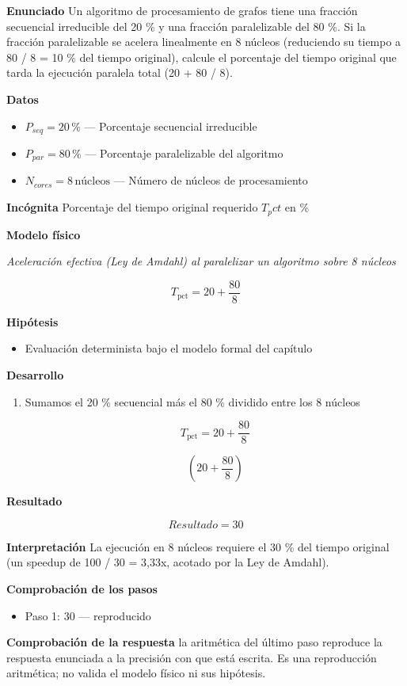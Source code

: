 \documentclass{book}
\begin{document}
\begin{tcolorbox}[title={Problema resuelto}, studiumworked, breakable]

\noindent\textbf{Enunciado}
Un algoritmo de procesamiento de grafos tiene una fracción secuencial irreducible del 20 \% y una fracción paralelizable del 80 \%. Si la fracción paralelizable se acelera linealmente en 8 núcleos (reduciendo su tiempo a 80 / 8 = 10 \% del tiempo original), calcule el porcentaje del tiempo original que tarda la ejecución paralela total (20 + 80 / 8).

\noindent\textbf{Datos}
\begin{itemize}
\item $P_{seq} = 20\,\mathrm{\%}$ — Porcentaje secuencial irreducible
\item $P_{par} = 80\,\mathrm{\%}$ — Porcentaje paralelizable del algoritmo
\item $N_{cores} = 8\,\mathrm{núcleos}$ — Número de núcleos de procesamiento
\end{itemize}

\noindent\textbf{Incógnita}
Porcentaje del tiempo original requerido \(T_pct\) en \%

\noindent\textbf{Modelo físico}

\noindent\textit{Aceleración efectiva (Ley de Amdahl) al paralelizar un algoritmo sobre 8 núcleos}

\[
T_{\text{pct}} = 20 + \frac{80}{8}
\]

\noindent\textbf{Hipótesis}
\begin{itemize}
\item Evaluación determinista bajo el modelo formal del capítulo
\end{itemize}

\noindent\textbf{Desarrollo}
\begin{enumerate}
\item
Sumamos el 20 \% secuencial más el 80 \% dividido entre los 8 núcleos

\[
T_{\text{pct}} = 20 + \frac{80}{8}
\]

\[
\left(20+\frac{80}{8}\right)
\]
\end{enumerate}

\noindent\textbf{Resultado}

\[
Resultado = 30
\]

\noindent\textbf{Interpretación}
La ejecución en 8 núcleos requiere el 30 \% del tiempo original (un speedup de 100 / 30 = 3,33x, acotado por la Ley de Amdahl).

\noindent\textbf{Comprobación de los pasos}
\begin{itemize}
\item Paso 1: $30$ — reproducido
\end{itemize}

\noindent\textbf{Comprobación de la respuesta} la aritmética del último paso reproduce la respuesta enunciada a la precisión con que está escrita. Es una reproducción aritmética; no valida el modelo físico ni sus hipótesis.
\end{tcolorbox}
\end{document}
